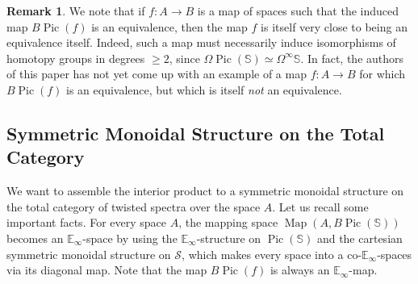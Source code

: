 \documentclass[10pt]{amsart}
\theoremstyle{plain}
\theoremstyle{definition}
\newtheorem{rmk}[theorem]{Remark}
\DeclareMathOperator{\Pic}{Pic}
\DeclareMathOperator{\Map}{Map}
\newcommand{\bE}{\mathbb{E}}
\newcommand{\bS}{\mathbb{S}}
\newcommand{\cS}{\mathcal{S}}
\begin{document}
\begin{rmk}
  We note that if $f : A \to B$ is a map of spaces such that the induced map $B\Pic(f)$ is an equivalence, then the map $f$ is itself very close to being an equivalence itself.
  Indeed, such a map must necessarily induce isomorphisms of homotopy groups in degrees $\geq 2$, since $\Omega \Pic(\bS) \simeq \Omega^\infty \bS$.
  In fact, the authors of this paper has not yet come up with an example of a map $f : A \to B$ for which $B\Pic(f)$ is an equivalence, but which is itself \emph{not} an equivalence.
\end{rmk}

\subsection{Symmetric Monoidal Structure on the Total Category}

We want to assemble the interior product to a symmetric monoidal structure on the total category of twisted spectra over the space $A$.
 Let us recall some important facts.
 For every space $A$, the mapping space $\Map(A,B\Pic(\bS))$ becomes an $\bE_\infty$-space by using the $\bE_\infty$-structure on $\Pic(\bS)$ and the cartesian symmetric monoidal structure on $\cS$, which makes every space into a co-$\bE_\infty$-spaces via its diagonal map.
 Note that the map $B\Pic(f)$ is always an $\bE_\infty$-map.
\end{document}
